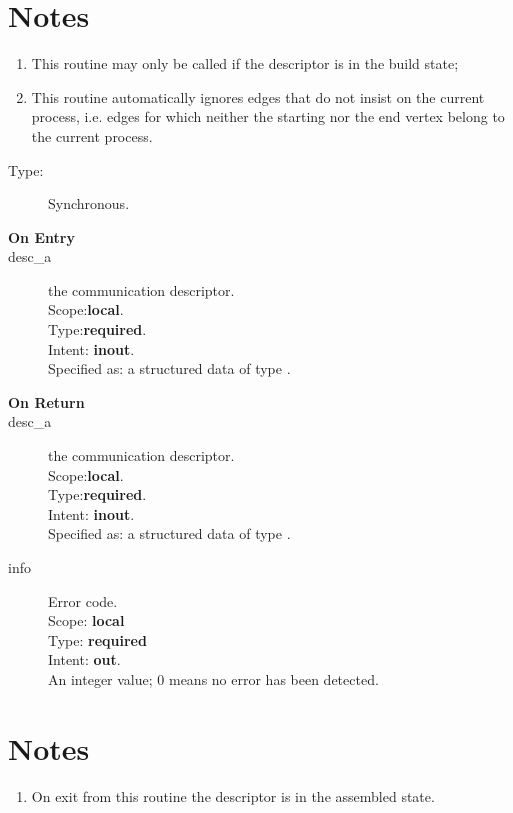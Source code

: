 \section*{Notes}
\begin{enumerate}
\item This routine may only be called if the descriptor is in the
  build state;
\item  This routine automatically ignores edges that do not
insist on the  current process, i.e. edges for which neither the starting
nor the end vertex belong to the current process. 
\end{enumerate}



%
%


\begin{description}
\item[Type:] Synchronous.
\item[\bf On Entry]
\item[desc\_a] the communication descriptor.\\
Scope:{\bf local}.\\
Type:{\bf required}.\\
Intent: {\bf inout}.\\
Specified as: a structured data of type \descdata.
\end{description}

\begin{description}
\item[\bf On Return]
\item[desc\_a] the communication descriptor.\\
Scope:{\bf local}.\\
Type:{\bf required}.\\
Intent: {\bf inout}.\\
Specified as: a structured data of type \descdata.
\item[info] Error code.\\
Scope: {\bf local} \\
Type: {\bf required} \\
Intent: {\bf out}.\\
An integer value; 0 means no error has been detected. 
\end{description}
\section*{Notes}
\begin{enumerate}
\item On exit from this routine the descriptor is in the assembled
  state. 
\end{enumerate}



